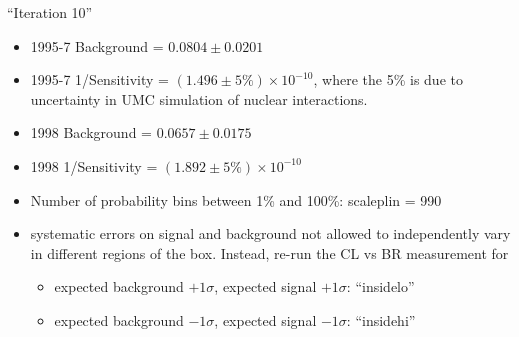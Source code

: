 \documentclass[11pt,twoside]{article}
\begin{document}
``Iteration 10''
\begin{itemize}
\item 1995-7 Background = $0.0804 \pm 0.0201$
\item 1995-7 1/Sensitivity = $(1.496 \pm 5\%) \times 10^{-10}$,
where the 5\% is due to uncertainty in UMC simulation of nuclear interactions.
\item 1998 Background = $0.0657 \pm 0.0175$
\item 1998 1/Sensitivity = $(1.892 \pm 5\%) \times 10^{-10}$
\item Number of probability bins between 1\% and 100\%:  scaleplin = 990
\item systematic errors on signal and background not allowed to
independently vary in different regions of the box.  Instead, re-run
the CL vs BR measurement for
\begin{itemize}
\item expected background $+ 1\sigma$, expected signal $+ 1\sigma$:  ``insidelo''
\item expected background $- 1\sigma$, expected signal $- 1\sigma$:  ``insidehi''
\end{itemize}
\end{itemize}
\end{document}
